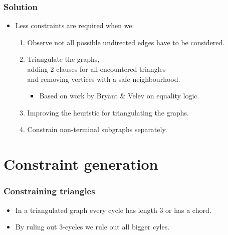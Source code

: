 \documentclass{beamer}
\begin{document}
\begin{frame}
    \frametitle{Solution}
    \begin{itemize}
        \item Less constraints are required when we:
        \begin{enumerate}
            \item Observe not all possible undirected edges have to be considered.
            \item Triangulate the graphs,\\
                    adding 2 clauses for all encountered triangles\\
                    and removing vertices with a safe neighbourhood.
            \begin{itemize}
                \item Based on work by Bryant \& Velev on equality logic.
            \end{itemize}
            \item Improving the heuristic for triangulating the graphs.
            \item Constrain non-terminal subgraphs separately.
        \end{enumerate}
    \end{itemize}
\end{frame}

\section{Constraint generation}
\begin{frame}
    \frametitle{Constraining triangles}
    \begin{itemize}
        \item In a triangulated graph every cycle has length 3 or has a chord.
        \item By ruling out 3-cycles we rule out all bigger cyles.
    \end{itemize}
    \begin{figure}
    \end{figure}
\end{frame}
\end{document}
